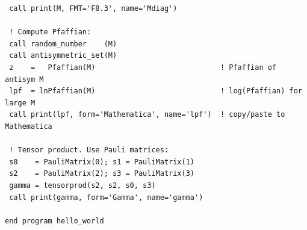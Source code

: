 \begin{lstlisting}
 call print(M, FMT='F8.3', name='Mdiag')

 ! Compute Pfaffian:
 call random_number    (M)
 call antisymmetric_set(M)
 z    =   Pfaffian(M)                             ! Pfaffian of antisym M
 lpf  = lnPfaffian(M)                             ! log(Pfaffian) for large M
 call print(lpf, form='Mathematica', name='lpf')  ! copy/paste to Mathematica

 ! Tensor product. Use Pauli matrices:
 s0    = PauliMatrix(0); s1 = PauliMatrix(1)
 s2    = PauliMatrix(2); s3 = PauliMatrix(3)
 gamma = tensorprod(s2, s2, s0, s3)
 call print(gamma, form='Gamma', name='gamma')

end program hello_world
\end{lstlisting}
